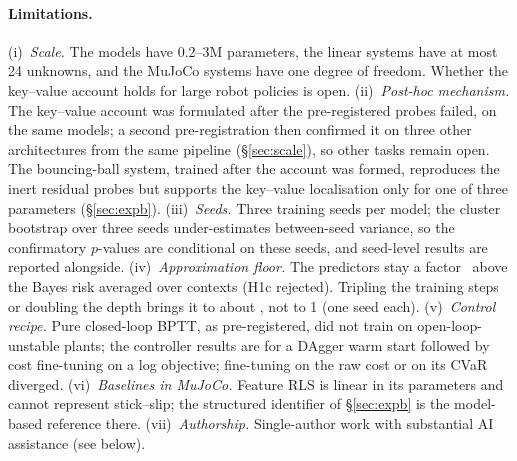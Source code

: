 \paragraph{Limitations.} (i)~\emph{Scale.} The models have 0.2--3M parameters, the linear systems have at most 24
unknowns, and the MuJoCo systems have one degree of freedom. Whether the key--value account holds for large
robot policies is open. (ii)~\emph{Post-hoc mechanism.} The key--value account was formulated after the
pre-registered probes failed, on the same models; a second pre-registration then confirmed it on three other architectures
from the same pipeline (\S\ref{sec:scale}), so other tasks remain open. The bouncing-ball system, trained after the account was formed, reproduces the inert residual probes but supports the key--value localisation only for one of three parameters (\S\ref{sec:expb}). (iii)~\emph{Seeds.} Three training seeds per model; the
cluster bootstrap over three seeds under-estimates between-seed variance, so the confirmatory $p$-values are conditional on
these seeds, and seed-level results are reported alongside. (iv)~\emph{Approximation floor.} The predictors stay a factor
\Aratio\ above the Bayes risk averaged over contexts (H1c rejected). Tripling the training steps or doubling the depth brings it to about \ScLongRatio, not to 1 (one seed each). (v)~\emph{Control recipe.}
Pure closed-loop BPTT, as pre-registered, did not train on open-loop-unstable plants; the controller results are for a
DAgger warm start followed by cost fine-tuning on a log objective; fine-tuning on the raw cost or on its CVaR diverged. (vi)~\emph{Baselines in MuJoCo.} Feature RLS is
linear in its parameters and cannot represent stick--slip; the structured identifier of \S\ref{sec:expb} is the
model-based reference there. (vii)~\emph{Authorship.} Single-author work with substantial AI assistance (see below).

